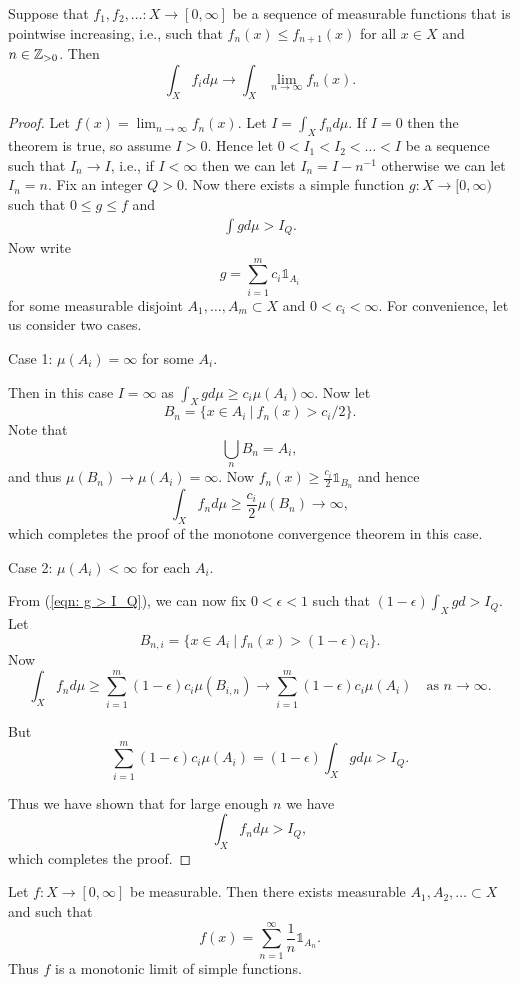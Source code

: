 \documentclass[twoside, a4paper, 10pt]{amsart}
\begin{document}
\begin{thm} Suppose that $f_1,f_2,\ldots: X \to [0,\infty]$ be a sequence of measurable functions that is pointwise increasing, i.e., such that $f_{n}(x) \leq f_{n+1}(x)$ for all $x \in X$ and $n \in \mathbb{Z}_{>0}$. Then $$\int_{X} f_i d\mu \to \int_{X} \lim_{n\to \infty} f_n(x).$$

\end{thm}

\begin{proof} Let $f(x) = \lim_{n \to \infty} f_n(x)$. Let $I = \int_X f_n d\mu$. If $I = 0$ then the theorem is true, so assume $I>0$. Hence let $0< I_1 < I_2 < \ldots <I$ be a sequence such that $I_{n} \to I$, i.e., if $I < \infty$ then we can let $I_n = I - n^{-1}$ otherwise we can let $I_n = n$. Fix an integer $Q>0$. Now there exists a simple function $g:X \to [0,\infty)$ such that $0\leq g \leq f$ and 
\begin{align}\label{eqn: g > I_Q} \int g d\mu > I_Q.\end{align}
Now write $$g = \sum_{i=1}^m c_i \mathds{1}_{A_i}$$ for some measurable disjoint $A_1, \ldots, A_m \subset X$ and $0 < c_i < \infty$. 
For convenience, let us consider two cases. 

Case 1: $\mu(A_i) = \infty$ for some $A_i$.

Then in this case $I = \infty$ as $\int_{X} g d\mu \geq c_i \mu(A_i) \infty$. Now let $$B_n = \{ x \in A_i ~|~ f_n(x) > c_i/2 \}.$$ Note that $$\bigcup_{n} B_n = A_i,$$ and thus $\mu(B_n) \to \mu(A_i) = \infty$. Now $f_n(x) \geq \frac{c_i}{2}\mathds{1}_{B_n}$ and hence $$\int_{X} f_n d\mu \geq \frac{c_i}{2}\mu(B_n) \to \infty,$$ which completes the proof of the monotone convergence theorem in this case.

Case 2: $\mu(A_i) < \infty$ for each $A_i$.

From (\ref{eqn: g > I_Q}), we can now fix $0 < \epsilon < 1$ such that $(1-\epsilon)\int_X g d > I_Q.$ Let 
$$B_{n,i} =  \{ x \in A_i ~|~ f_n(x) > (1-\epsilon)c_i \}.$$  Now 
$$\int_{X} f_n d\mu \geq \sum_{i=1}^m (1-\epsilon)c_i \mu(B_{i,n}) \to \sum_{i=1}^m (1-\epsilon)c_i \mu(A_i) \quad \text{as } n \to \infty.$$

But $$\sum_{i=1}^m (1-\epsilon)c_i \mu(A_i) = (1-\epsilon) \int_{X} g d\mu > I_Q. $$

Thus we have shown that for large enough $n$ we have $$\int_X f_n d\mu > I_Q,$$
which completes the proof. \end{proof}

\begin{prop} Let $f:X \to [0, \infty]$ be measurable. Then there exists measurable $A_1,A_2, \ldots \subset X$ and such that $$f(x) = \sum_{n=1}^{\infty} \frac{1}{n} \mathds{1}_{A_n}.$$ Thus $f$ is a monotonic limit of simple functions.

\end{prop}
\end{document}
